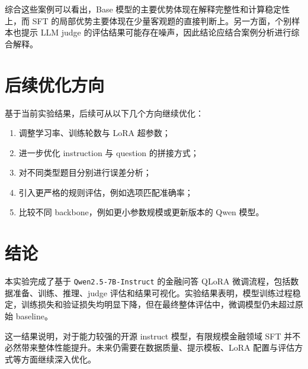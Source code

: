 \documentclass[UTF8,a4paper,12pt]{ctexart}
\begin{document}
综合这些案例可以看出，Base 模型的主要优势体现在解释完整性和计算稳定性上，而 SFT 的局部优势主要体现在少量客观题的直接判断上。另一方面，个别样本也提示 LLM judge 的评估结果可能存在噪声，因此结论应结合案例分析进行综合解释。

\section{后续优化方向}
基于当前实验结果，后续可从以下几个方向继续优化：

\begin{enumerate}[leftmargin=2em]
    \item 调整学习率、训练轮数与 LoRA 超参数；
    \item 进一步优化 instruction 与 question 的拼接方式；
    \item 对不同类型题目分别进行误差分析；
    \item 引入更严格的规则评估，例如选项匹配准确率；
    \item 比较不同 backbone，例如更小参数规模或更新版本的 Qwen 模型。
\end{enumerate}

\section{结论}
本实验完成了基于 \texttt{Qwen2.5-7B-Instruct} 的金融问答 QLoRA 微调流程，包括数据准备、训练、推理、judge 评估和结果可视化。实验结果表明，模型训练过程稳定，训练损失和验证损失均明显下降，但在最终整体评估中，微调模型仍未超过原始 baseline。

这一结果说明，对于能力较强的开源 instruct 模型，有限规模金融领域 SFT 并不必然带来整体性能提升。未来仍需要在数据质量、提示模板、LoRA 配置与评估方式等方面继续深入优化。
\end{document}

